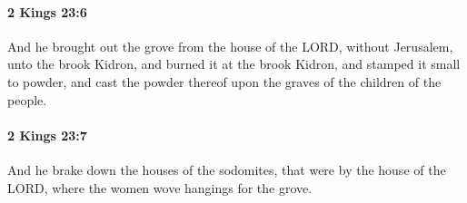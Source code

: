 		\paragraph{2 Kings 23:6} %
			\label{2KINGS-23-6}

			And he brought out the grove from the house of the LORD, without Jerusalem, unto the brook Kidron, and burned it at the brook Kidron, and stamped it small to powder, and cast the powder thereof upon the graves of the children of the people.


		\paragraph{2 Kings 23:7} %
			\label{2KINGS-23-7}

			And he brake down the houses of the sodomites, that were by the house of the LORD, where the women wove hangings for the grove.


